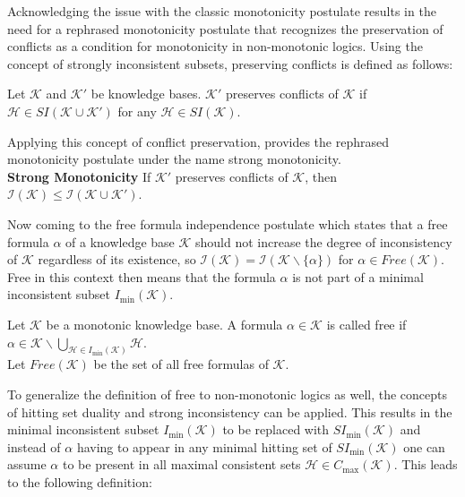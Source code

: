 Acknowledging the issue with the classic monotonicity postulate results in the need for a rephrased monotonicity postulate that recognizes the preservation of conflicts as a condition for monotonicity in non-monotonic logics. Using the concept of strongly inconsistent subsets, preserving conflicts is defined as follows:

\begin{definition}
    Let \(\mathcal{K}\) and \(\mathcal{K}'\) be knowledge bases. \(\mathcal{K}'\) preserves conflicts of \(\mathcal{K}\) if \(\mathcal{H} \in SI(\mathcal{K} \cup \mathcal{K}')\) for any \(\mathcal{H} \in SI(\mathcal{K})\).
\end{definition}

Applying this concept of conflict preservation, \cite{ulbricht_handling_2020} provides the rephrased monotonicity postulate under the name strong monotonicity.
\\
\textbf{Strong Monotonicity}
If \(\mathcal{K}'\) preserves conflicts of \(\mathcal{K}\), then \(\mathcal{I}(\mathcal{K}) \leq \mathcal{I}(\mathcal{K \cup \mathcal{K}'})\).

Now coming to the free formula independence postulate which states that a free formula \(\alpha\) of a knowledge base \(\mathcal{K}\) should not increase the degree of inconsistency of \(\mathcal{K}\) regardless of its existence, so \(\mathcal{I}(\mathcal{K}) = \mathcal{I}(\mathcal{K} \backslash \{\alpha\})\) for \(\alpha \in Free(\mathcal{K})\). Free in this context then means that the formula \(\alpha\) is not part of a minimal inconsistent subset \(I_{\min}(\mathcal{K})\).

\begin{definition}
    Let \(\mathcal{K}\) be a monotonic knowledge base. A formula \(\alpha \in \mathcal{K}\) is called free if\\
    \(\alpha \in \mathcal{K} \backslash \bigcup\limits_{\mathcal{H} \in I_{\min}(\mathcal{K})} \mathcal{H}\).\\
    Let \(Free(\mathcal{K})\) be the set of all free formulas of \(\mathcal{K}\).
\end{definition}

To generalize the definition of free to non-monotonic logics as well, the concepts of hitting set duality and strong inconsistency can be applied. This results in the minimal inconsistent subset \(I_{\min}(\mathcal{K})\) to be replaced with \(SI_{\min}(\mathcal{K})\) and instead of \(\alpha\) having to appear in any minimal hitting set of \(SI_{\min}(\mathcal{K})\) one can assume \(\alpha\) to be present in all maximal consistent sets \(\mathcal{H} \in C_{\max}(\mathcal{K})\). This leads to the following definition:


